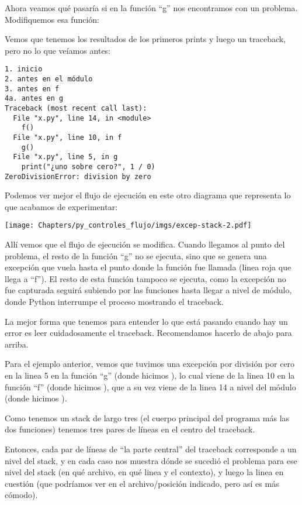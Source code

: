 Ahora veamos qué pasaría si en la función ``g'' nos encontramos con un problema. Modifiquemos esa función:


Vemos que tenemos los resultados de los primeros prints y luego un traceback, pero no lo que veíamos antes:

\begin{verbatim}
1. inicio
2. antes en el módulo
3. antes en f
4a. antes en g
Traceback (most recent call last):
  File "x.py", line 14, in <module>
    f()
  File "x.py", line 10, in f
    g()
  File "x.py", line 5, in g
    print("¿uno sobre cero?", 1 / 0)
ZeroDivisionError: division by zero
\end{verbatim}  

Podemos ver mejor el flujo de ejecución en este otro diagrama que representa lo que acabamos de experimentar:

\begin{center}
    \texttt{[image: Chapters/py\_controles\_flujo/imgs/excep-stack-2.pdf]}
\end{center}

Allí vemos que el flujo de ejecución se modifica. Cuando llegamos al punto del problema, el resto de la función ``g'' no se ejecuta, sino que se genera una excepción que vuela hasta el punto donde la función fue llamada (linea roja que llega a ``f''). El resto de esta función tampoco se ejecuta, como la excepción no fue capturada seguirá subiendo por las funciones hasta llegar a nivel de módulo, donde Python interrumpe el proceso mostrando el traceback.

La mejor forma que tenemos para entender lo que está pasando cuando hay un error es leer cuidadosamente el traceback. Recomendamos hacerlo de abajo para arriba. 

Para el ejemplo anterior, vemos que tuvimos una excepción por división por cero en la linea 5 en la función ``g'' (donde hicimos ), lo cual viene de la linea 10 en la función ``f'' (donde hicimos ), que a su vez viene de la linea 14 a nivel del módulo (donde hicimos ).

Como tenemos un stack de largo tres (el cuerpo principal del programa más las dos funciones) tenemos tres pares de líneas en el centro del traceback. 

Entonces, cada par de líneas de ``la parte central'' del traceback corresponde a un nivel del stack, y en cada caso nos muestra dónde se sucedió el problema para ese nivel del stack (en qué archivo, en qué linea y el contexto), y luego la linea en cuestión (que podríamos ver en el archivo/posición indicado, pero así es más cómodo).


